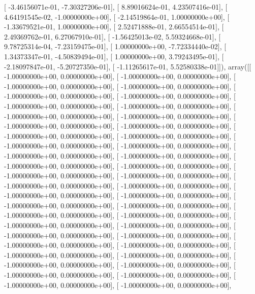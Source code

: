 \documentclass{article}
\begin{document}
       [ -3.46156071e-01,  -7.30327206e-01],
       [  8.89016624e-01,   4.23507416e-01],
       [  4.64191545e-02,  -1.00000000e+00],
       [ -2.14519864e-01,   1.00000000e+00],
       [ -1.33679521e-01,   1.00000000e+00],
       [  2.52471888e-01,   2.66554514e-01],
       [  2.49369762e-01,   6.27067910e-01],
       [ -1.56425013e-02,   5.59324668e-01],
       [  9.78725314e-04,  -7.23159475e-01],
       [  1.00000000e+00,  -7.72334440e-02],
       [  1.34373347e-01,  -4.50839494e-01],
       [  1.00000000e+00,   3.79243495e-01],
       [ -2.18097847e-01,  -5.20727350e-01],
       [ -1.11265617e-01,   5.52580338e-01]]), array([[ -1.00000000e+00,   0.00000000e+00],
       [ -1.00000000e+00,   0.00000000e+00],
       [ -1.00000000e+00,   0.00000000e+00],
       [ -1.00000000e+00,   0.00000000e+00],
       [ -1.00000000e+00,   0.00000000e+00],
       [ -1.00000000e+00,   0.00000000e+00],
       [ -1.00000000e+00,   0.00000000e+00],
       [ -1.00000000e+00,   0.00000000e+00],
       [ -1.00000000e+00,   0.00000000e+00],
       [ -1.00000000e+00,   0.00000000e+00],
       [ -1.00000000e+00,   0.00000000e+00],
       [ -1.00000000e+00,   0.00000000e+00],
       [ -1.00000000e+00,   0.00000000e+00],
       [ -1.00000000e+00,   0.00000000e+00],
       [ -1.00000000e+00,   0.00000000e+00],
       [ -1.00000000e+00,   0.00000000e+00],
       [ -1.00000000e+00,   0.00000000e+00],
       [ -1.00000000e+00,   0.00000000e+00],
       [ -1.00000000e+00,   0.00000000e+00],
       [ -1.00000000e+00,   0.00000000e+00],
       [ -1.00000000e+00,   0.00000000e+00],
       [ -1.00000000e+00,   0.00000000e+00],
       [ -1.00000000e+00,   0.00000000e+00],
       [ -1.00000000e+00,   0.00000000e+00],
       [ -1.00000000e+00,   0.00000000e+00],
       [ -1.00000000e+00,   0.00000000e+00],
       [ -1.00000000e+00,   0.00000000e+00],
       [ -1.00000000e+00,   0.00000000e+00],
       [ -1.00000000e+00,   0.00000000e+00],
       [ -1.00000000e+00,   0.00000000e+00],
       [ -1.00000000e+00,   0.00000000e+00],
       [ -1.00000000e+00,   0.00000000e+00],
       [ -1.00000000e+00,   0.00000000e+00],
       [ -1.00000000e+00,   0.00000000e+00],
       [ -1.00000000e+00,   0.00000000e+00],
       [ -1.00000000e+00,   0.00000000e+00],
       [ -1.00000000e+00,   0.00000000e+00],
       [ -1.00000000e+00,   0.00000000e+00],
       [ -1.00000000e+00,   0.00000000e+00],
       [ -1.00000000e+00,   0.00000000e+00],
       [ -1.00000000e+00,   0.00000000e+00],
       [ -1.00000000e+00,   0.00000000e+00],
       [ -1.00000000e+00,   0.00000000e+00],
       [ -1.00000000e+00,   0.00000000e+00],
\end{document}
